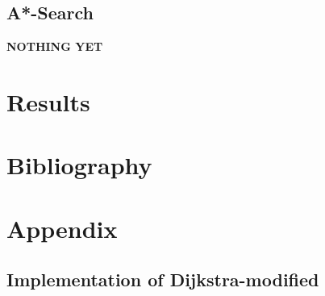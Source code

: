 \documentclass[11pt]{article}
\begin{document}
\subsection{A*-Search}
\textbf{NOTHING YET}
\newpage



\section{Results}
\section{Bibliography}
\section{Appendix}
\subsection{Implementation of Dijkstra-modified}
\end{document}
